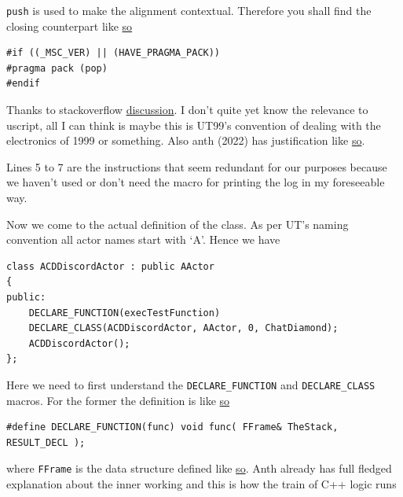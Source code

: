 \documentclass{article}
\theoremstyle{definition}
\begin{document}
\texttt{push} is used to make the alignment contextual.  Therefore you shall find the closing counterpart like \href{https://github.com/ravimohan1991/ChatDiamond/blob/f7950b2591b93a54600459ec58d7ddf57fe9218d/UTNativeEssentials/ChatDiamond/Inc/ActorNativeClass.h#L62}{so}

\lstset{language=C++}
\begin{lstlisting}[frame=single]
#if ((_MSC_VER) || (HAVE_PRAGMA_PACK))
#pragma pack (pop)
#endif
\end{lstlisting}

Thanks to stackoverflow \href{https://stackoverflow.com/questions/3318410/pragma-pack-effect}{discussion}.  I don't quite yet know the relevance to uscript, all I can think is maybe this is UT99's convention 
of dealing with the electronics of 1999 or something.  Also anth (2022) has justification like \href{https://github.com/ravimohan1991/ChatDiamond/blob/f7950b2591b93a54600459ec58d7ddf57fe9218d/UTNativeEssentials/Core/Inc/UnBuild.h#L154-L155}{so}.

Lines 5 to 7 are the instructions that seem redundant for our purposes because we haven't used or don't need the macro for printing the log in my foreseeable way.

Now we come to the actual definition of the class.  As per UT's naming convention all actor names start with `A'.  Hence we have

\lstset{language=C++}
\begin{lstlisting}[frame=single]
class ACDDiscordActor : public AActor
{
public:
	DECLARE_FUNCTION(execTestFunction)
	DECLARE_CLASS(ACDDiscordActor, AActor, 0, ChatDiamond);
	ACDDiscordActor();
};
\end{lstlisting}

Here we need to first understand the \texttt{DECLARE\_FUNCTION} and \texttt{DECLARE\_CLASS} macros.  For the former the definition is like \href{https://github.com/ravimohan1991/ChatDiamond/blob/5592fef2b13305e441c1dd2b09dde7dd52ff2d83/UTNativeEssentials/Core/Inc/UnObjBas.h#L829}{so}

\lstset{language=C++}
\begin{lstlisting}[frame=single]
#define DECLARE_FUNCTION(func) void func( FFrame& TheStack, RESULT_DECL );
\end{lstlisting}

where \texttt{FFrame} is the data structure defined like \href{https://github.com/ravimohan1991/ChatDiamond/blob/5592fef2b13305e441c1dd2b09dde7dd52ff2d83/UTNativeEssentials/Core/Inc/UnStack.h#L273}{so}.  Anth already has full fledged explanation about the inner working and this is how
the train of C++ logic runs
\end{document}
